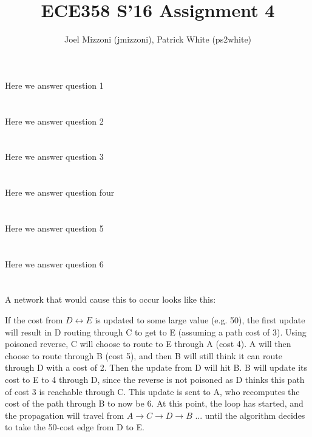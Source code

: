 \documentclass[10pt,a4paper]{article}
\author{Joel Mizzoni (jmizzoni), Patrick White (ps2white)}
\begin{document}
\title{ECE358 S'16 Assignment 4}
\maketitle
\section{}
Here we answer question 1
\section{}
Here we answer question 2
\section{}
Here we answer question 3
\section{}
Here we answer question four
\section{}
Here we answer question 5
\section{}
Here we answer question 6
\section{}
A network that would cause this to occur looks like this:


If the cost from $D \leftrightarrow E$ is updated to some large value (e.g. 50), the first update will result in D routing through C to get to E (assuming a path cost of 3). Using poisoned reverse, C will choose to route to E through A (cost 4). A will then choose to route through B (cost 5), and then B will still think it can route through D with a cost of 2. Then the update from D will hit B. B will update its cost to E to 4 through D, since the reverse is not poisoned as D thinks this path of cost 3 is reachable through C. This update is sent to A, who recomputes the cost of the path through B to now be 6. At this point, the loop has started, and the propagation will travel from $A \rightarrow C \rightarrow D \rightarrow B$ ... until the algorithm decides to take the 50-cost edge from D to E. 
\end{document}
